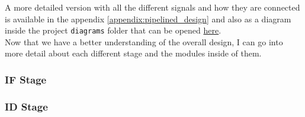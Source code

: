 A more detailed version with all the different signals and how they are connected is available in the appendix \ref{appendix:pipelined_design} and
also as a diagram inside the project \texttt{diagrams} folder that can be opened \href{https://app.diagrams.net/}{here}. \\

Now that we have a better understanding of the overall design, I can go into more detail about each different stage and the modules inside of them.

\subsubsection{IF Stage}



\subsubsection{ID Stage}











